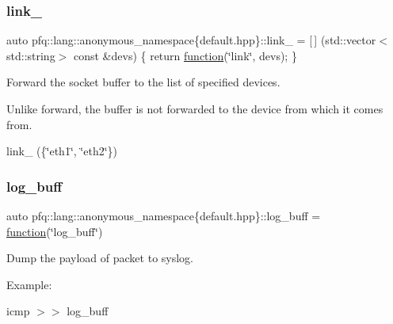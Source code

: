 \subsubsection{\texorpdfstring{link\+\_\+}{link\_}}
{\footnotesize\ttfamily auto pfq\+::lang\+::anonymous\+\_\+namespace\{default.\+hpp\}\+::link\+\_\+ = \mbox{[}$\,$\mbox{]} (std\+::vector$<$std\+::string$>$ const \&devs) \{ return \hyperlink{namespacepfq_1_1lang_a1a4638059d700ae08d0ca63886ff2bb3}{function}(\char`\"{}link\char`\"{}, devs); \}}



Forward the socket buffer to the list of specified devices. 

Unlike forward, the buffer is not forwarded to the device from which it comes from.

link\+\_\+ (\{\char`\"{}eth1\char`\"{}, \char`\"{}eth2\char`\"{}\}) \mbox{\label{namespacepfq_1_1lang_1_1anonymous__namespace_02default_8hpp_03_ac16d4c4b496e6e882901d84ded462101}} 
\subsubsection{\texorpdfstring{log\+\_\+buff}{log\_buff}}
{\footnotesize\ttfamily auto pfq\+::lang\+::anonymous\+\_\+namespace\{default.\+hpp\}\+::log\+\_\+buff = \hyperlink{namespacepfq_1_1lang_a1a4638059d700ae08d0ca63886ff2bb3}{function}(\char`\"{}log\+\_\+buff\char`\"{})}



Dump the payload of packet to syslog. 

Example\+:

icmp $>$$>$ log\+\_\+buff \mbox{\label{namespacepfq_1_1lang_1_1anonymous__namespace_02default_8hpp_03_a82e76226844f043aac9a2dd01615c9bb}} 
